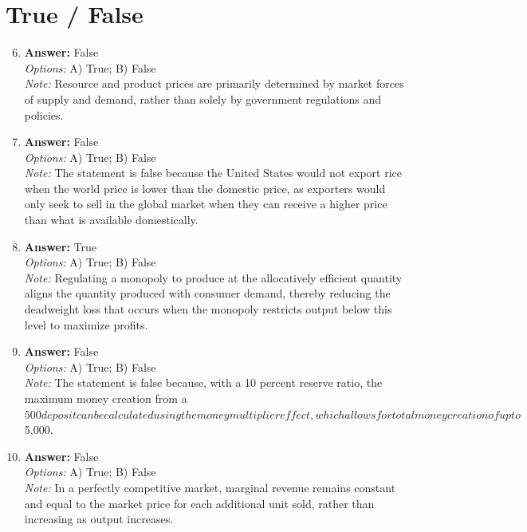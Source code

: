 \documentclass[12pt]{article}
\begin{document}
\section*{True / False}
\begin{enumerate}[label=\arabic*.]
\setcounter{enumi}{5}
\item \textbf{Answer:} False
\\ \textit{Options:} A) True; B) False
\\ \textit{Note:} Resource and product prices are primarily determined by market forces of supply and demand, rather than solely by government regulations and policies.
\item \textbf{Answer:} False
\\ \textit{Options:} A) True; B) False
\\ \textit{Note:} The statement is false because the United States would not export rice when the world price is lower than the domestic price, as exporters would only seek to sell in the global market when they can receive a higher price than what is available domestically.
\item \textbf{Answer:} True
\\ \textit{Options:} A) True; B) False
\\ \textit{Note:} Regulating a monopoly to produce at the allocatively efficient quantity aligns the quantity produced with consumer demand, thereby reducing the deadweight loss that occurs when the monopoly restricts output below this level to maximize profits.
\item \textbf{Answer:} False
\\ \textit{Options:} A) True; B) False
\\ \textit{Note:} The statement is false because, with a 10 percent reserve ratio, the maximum money creation from a $500 deposit can be calculated using the money multiplier effect, which allows for total money creation of up to $5,000.
\item \textbf{Answer:} False
\\ \textit{Options:} A) True; B) False
\\ \textit{Note:} In a perfectly competitive market, marginal revenue remains constant and equal to the market price for each additional unit sold, rather than increasing as output increases.
\end{enumerate}
\end{document}
